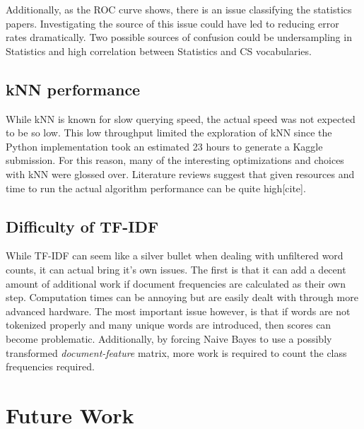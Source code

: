 \documentclass[10pt,twocolumn]{article}
\begin{document}
Additionally, as the ROC curve shows, there is an issue classifying the statistics papers. Investigating the source of this issue could have led to reducing error rates dramatically. Two possible sources of confusion could be undersampling in Statistics and high correlation between Statistics and CS vocabularies.

\subsection*{kNN performance}

While kNN is known for slow querying speed, the actual speed was not expected to be so low. This low throughput limited the exploration of kNN since the Python implementation took an estimated 23 hours to generate a Kaggle submission. For this reason, many of the interesting optimizations and choices with kNN were glossed over. Literature reviews suggest that given resources and time to run the actual algorithm performance can be quite high[cite].

\subsection*{Difficulty of TF-IDF}

While TF-IDF can seem like a silver bullet when dealing with unfiltered word counts, it can actual bring it's own issues. The first is that it can add a decent amount of additional work if document frequencies are calculated as their own step. Computation times can be annoying but are easily dealt with through more advanced hardware. The most important issue however, is that if words are not tokenized properly and many unique words are introduced, then scores can become problematic. Additionally, by forcing Naive Bayes to use a possibly transformed \emph{document-feature} matrix, more work is required to count the class frequencies required.

\section*{Future Work}
\end{document}
